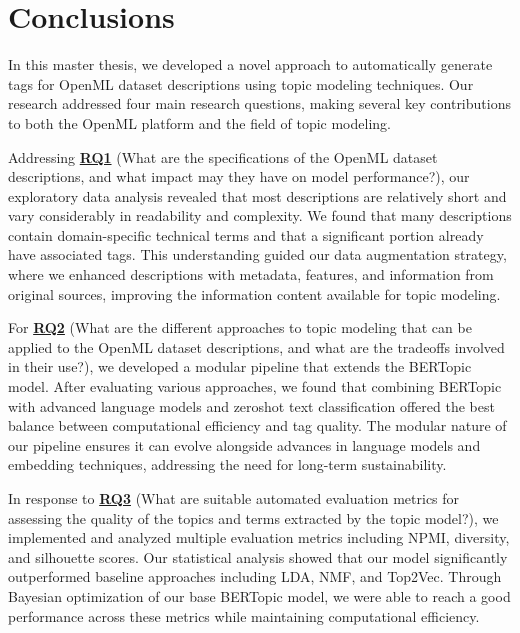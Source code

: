\section{Conclusions}
In this master thesis, we developed a novel approach to automatically generate tags for OpenML dataset descriptions using topic modeling techniques. Our research addressed four main research questions, making several key contributions to both the OpenML platform and the field of topic modeling.

Addressing \hyperref[rq1]{\textbf{RQ1}} (What are the specifications of the OpenML dataset descriptions, and what impact may they have on model performance?), our exploratory data analysis revealed that most descriptions are relatively short and vary considerably in readability and complexity. We found that many descriptions contain domain-specific technical terms and that a significant portion already have associated tags. This understanding guided our data augmentation strategy, where we enhanced descriptions with metadata, features, and information from original sources, improving the information content available for topic modeling.

For \hyperref[rq2]{\textbf{RQ2}} (What are the different approaches to topic modeling that can be applied to the OpenML dataset descriptions, and what are the tradeoffs involved in their use?), we developed a modular pipeline that extends the BERTopic model. After evaluating various approaches, we found that combining BERTopic with advanced language models and zeroshot text classification offered the best balance between computational efficiency and tag quality. The modular nature of our pipeline ensures it can evolve alongside advances in language models and embedding techniques, addressing the need for long-term sustainability.

In response to \hyperref[rq3]{\textbf{RQ3}} (What are suitable automated evaluation metrics for assessing the quality of the topics and terms extracted by the topic model?), we implemented and analyzed multiple evaluation metrics including NPMI, diversity, and silhouette scores. Our statistical analysis showed that our model significantly outperformed baseline approaches including LDA, NMF, and Top2Vec. Through Bayesian optimization of our base BERTopic model, we were able to reach a good performance across these metrics while maintaining computational efficiency.

